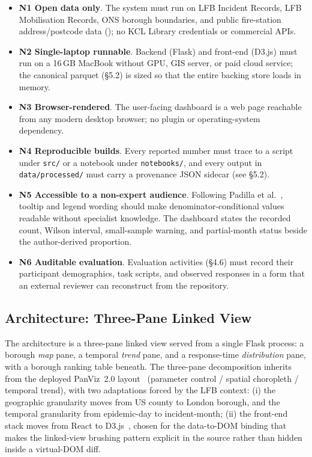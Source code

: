 \begin{itemize}
    \item \textbf{N1 Open data only}. The system must run on LFB Incident Records, LFB Mobilisation Records, ONS borough boundaries, and public fire-station address/postcode data (\cite{lfb_incidents, lfb_mobilisations, ons_boundaries, lfb_stations, lfb_attendance}); no KCL Library credentials or commercial APIs.
    \item \textbf{N2 Single-laptop runnable}. Backend (Flask) and front-end (D3.js) must run on a 16\,GB MacBook without GPU, GIS server, or paid cloud service; the canonical parquet (\S5.2) is sized so that the entire backing store loads in memory.
    \item \textbf{N3 Browser-rendered}. The user-facing dashboard is a web page reachable from any modern desktop browser; no plugin or operating-system dependency.
    \item \textbf{N4 Reproducible builds}. Every reported number must trace to a script under \texttt{src/} or a notebook under \texttt{notebooks/}, and every output in \texttt{data/processed/} must carry a provenance JSON sidecar (see \S5.2).
    \item \textbf{N5 Accessible to a non-expert audience}. Following Padilla et al.~\cite{padilla2018}, tooltip and legend wording should make denominator-conditional values readable without specialist knowledge. The dashboard states the recorded count, Wilson interval, small-sample warning, and partial-month status beside the author-derived proportion.
    \item \textbf{N6 Auditable evaluation}. Evaluation activities (\S4.6) must record their participant demographics, task scripts, and observed responses in a form that an external reviewer can reconstruct from the repository.
\end{itemize}

\subsection{Architecture: Three-Pane Linked View}

The architecture is a three-pane linked view served from a single Flask process: a borough \emph{map} pane, a temporal \emph{trend} pane, and a response-time \emph{distribution} pane, with a borough ranking table beneath. The three-pane decomposition inherits from the deployed PanViz~2.0 layout~\cite{panviz2020} (parameter control / spatial choropleth / temporal trend), with two adaptations forced by the LFB context: (i) the geographic granularity moves from US county to London borough, and the temporal granularity from epidemic-day to incident-month; (ii) the front-end stack moves from React to D3.js~\cite{bostock2011, heer2010}, chosen for the data-to-DOM binding that makes the linked-view brushing pattern explicit in the source rather than hidden inside a virtual-DOM diff.

